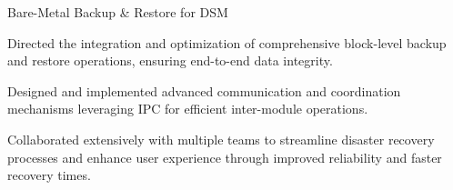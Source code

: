 \begin{cventries}
  \cventry
    {Bare-Metal Backup \& Restore for DSM} %
    {}
    {}
    {}
    {
      \begin{cvitems} %
        \item {Directed the integration and optimization of comprehensive block-level backup and restore operations, ensuring end-to-end data integrity.}
        \item {Designed and implemented advanced communication and coordination mechanisms leveraging IPC for efficient inter-module operations.}
        \item {Collaborated extensively with multiple teams to streamline disaster recovery processes and enhance user experience through improved reliability and faster recovery times.}
      \end{cvitems}
    }

\end{cventries}